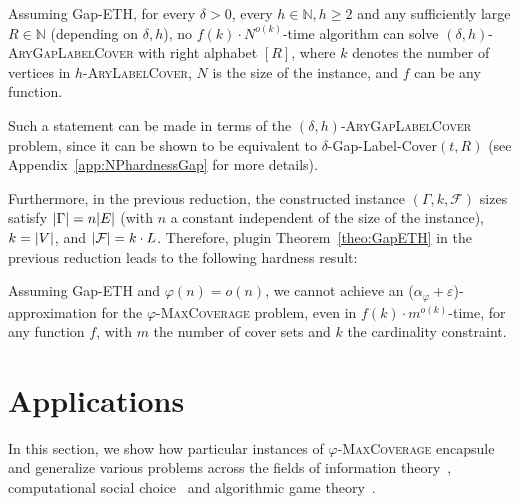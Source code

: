   \begin{theorem}
    \label{theo:GapETH}
    Assuming Gap-ETH, for every $\delta > 0$, every $h \in \mathbb{N}, h \geq 2$ and any sufficiently large $R \in \mathbb{N}$ (depending on $\delta, h$), no $f(k) \cdot N^{o(k)}$-time algorithm can solve $(\delta,h)$-\textsc{AryGapLabelCover} with right alphabet $[R]$, where $k$ denotes the number of vertices in $h$-\textsc{AryLabelCover}, $N$ is the size of the instance, and $f$ can be any function.
  \end{theorem}

  Such a statement can be made in terms of the $(\delta,h)$-\textsc{AryGapLabelCover} problem, since it can be shown to be equivalent to $\delta$-Gap-Label-Cover$(t,R)$ (see Appendix~\ref{app:NPhardnessGap} for more details).

  Furthermore, in the previous reduction, the constructed instance $(\Gamma,k,\mathcal{F})$ sizes satisfy $\abs{\Gamma} = n\abs{E}$ (with $n$ a constant independent of the size of the instance), $k=\abs{V}$, and $\abs{\mathcal{F}} = k \cdot L$. Therefore, plugin Theorem~\ref{theo:GapETH} in the previous reduction leads to the following hardness result:

  \begin{theorem}
    \label{theo:GapHardness}
    Assuming Gap-ETH and $\varphi(n) = o(n)$, we cannot achieve an ($\alpha_{\varphi} + \varepsilon$)-approximation for the $\varphi$-\textsc{MaxCoverage} problem, even in $f(k) \cdot m^{o(k)}$-time, for any function $f$, with $m$ the number of cover sets and $k$ the cardinality constraint.
  \end{theorem}
  
\section{Applications}
\label{section:applications}
In this section, we show how particular instances of $\varphi$-\textsc{MaxCoverage} encapsule and generalize various problems across the fields of information theory~\cite{CT01}, computational social choice~\cite{BCE16} and algorithmic game theory~\cite{NRTV07}.


